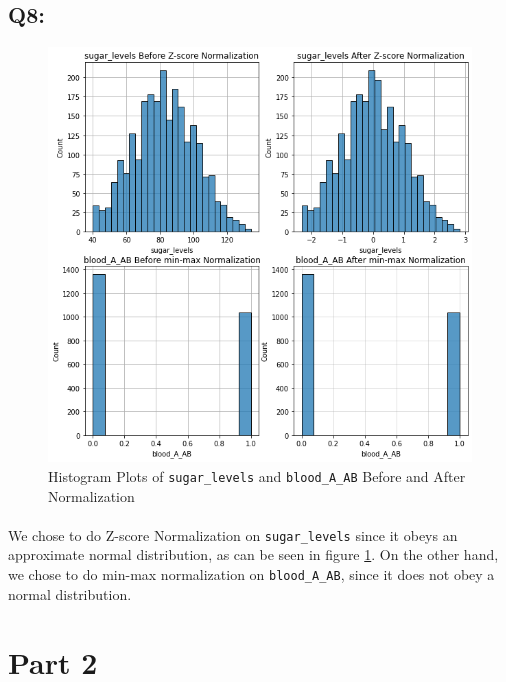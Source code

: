 \documentclass{article}
\newcommand{\code}[1]{\texttt{#1}}
\begin{document}
\subsection*{Q8:}
    \begin{figure}[H]
        \centering
        \includegraphics[scale=0.5]{q8_hists.png}
        \caption{Histogram Plots of \code{sugar\_levels} and \code{blood\_A\_AB} Before and After Normalization}
        \label{fig:q8_hist}
    \end{figure}
    \paragraph*{}
    We chose to do Z-score Normalization on \code{sugar\_levels} since it obeys an approximate normal distribution, as can be seen in figure \ref{fig:q8_hist}. On the other hand, we chose to do min-max normalization on \code{blood\_A\_AB}, since it does not obey a normal distribution.
\section*{Part 2}
\end{document}
